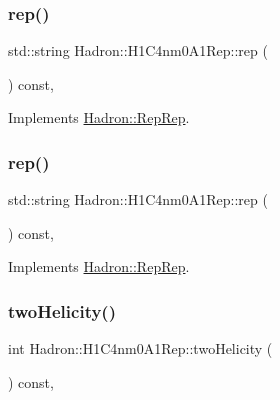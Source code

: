 \subsubsection{\texorpdfstring{rep()}{rep()}\hspace{0.1cm}{\footnotesize\ttfamily [4/5]}}
{\footnotesize\ttfamily std\+::string Hadron\+::\+H1\+C4nm0\+A1\+Rep\+::rep (\begin{DoxyParamCaption}{ }\end{DoxyParamCaption}) const\hspace{0.3cm}{\ttfamily [inline]}, {\ttfamily [virtual]}}



Implements \mbox{\hyperlink{structHadron_1_1RepRep_ab3213025f6de249f7095892109575fde}{Hadron\+::\+Rep\+Rep}}.

\mbox{\label{structHadron_1_1H1C4nm0A1Rep_acc6e3a3585fdfea2b5ef14c6035964e2}} 
\subsubsection{\texorpdfstring{rep()}{rep()}\hspace{0.1cm}{\footnotesize\ttfamily [5/5]}}
{\footnotesize\ttfamily std\+::string Hadron\+::\+H1\+C4nm0\+A1\+Rep\+::rep (\begin{DoxyParamCaption}{ }\end{DoxyParamCaption}) const\hspace{0.3cm}{\ttfamily [inline]}, {\ttfamily [virtual]}}



Implements \mbox{\hyperlink{structHadron_1_1RepRep_ab3213025f6de249f7095892109575fde}{Hadron\+::\+Rep\+Rep}}.

\mbox{\label{structHadron_1_1H1C4nm0A1Rep_a878150ec7ce5bf97a9d20d5cf82a16a9}} 
\subsubsection{\texorpdfstring{twoHelicity()}{twoHelicity()}\hspace{0.1cm}{\footnotesize\ttfamily [1/3]}}
{\footnotesize\ttfamily int Hadron\+::\+H1\+C4nm0\+A1\+Rep\+::two\+Helicity (\begin{DoxyParamCaption}{ }\end{DoxyParamCaption}) const\hspace{0.3cm}{\ttfamily [inline]}, {\ttfamily [virtual]}}

